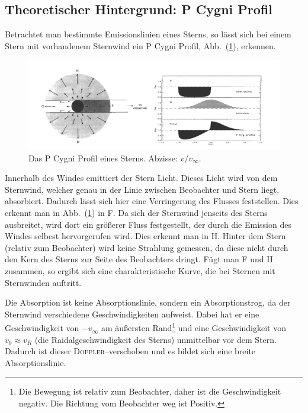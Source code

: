 \subsection{Theoretischer Hintergrund: P Cygni Profil} \label{sec:T-H-P-Cygni}
Betrachtet man bestimmte Emissionslinien eines Sterns, so lässt sich bei einem Stern mit vorhandenem Sternwind ein P Cygni Profil, Abb.\ (\ref{fig:p_cygni_profil}), erkennen.
\begin{figure}[t]
  \centering
  \includegraphics[width=.5\textwidth]{464_p_cygni_profil.png}
  \caption{Das P Cygni Profil eines Sterns. Abzisse: $v/v_\infty$.\cite{anleitung464}} \label{fig:p_cygni_profil}
\end{figure}

Innerhalb des Windes emittiert der Stern Licht.
Dieses Licht wird von dem Sternwind, welcher genau in der Linie zwischen Beobachter und Stern liegt, absorbiert.
Dadurch lässt sich hier eine Verringerung des Flusses feststellen.
Dies erkennt man in Abb.\ (\ref{fig:p_cygni_profil}) in F.
Da sich der Sternwind jenseits des Sterns ausbreitet, wird dort ein größerer Fluss festgestellt, der durch die Emission des Windes selbest hervorgerufen wird.
Dies erkennt man in H.
Hinter dem Stern (relativ zum Beobachter) wird keine Strahlung gemessen, da diese nicht durch den Kern des Sterns zur Seite des Beobachters dringt.
Fügt man F und H zusammen, so ergibt sich eine charakteristische Kurve, die bei Sternen mit Sternwinden auftritt.

Die Absorption ist keine Absorptionslinie, sondern ein Absorptionstrog, da der Sternwind verschiedene Geschwindigkeiten aufweist.
Dabei hat er eine Geschwindigkeit von $-v_\infty$ am äußersten Rand\footnote{Die Bewegung ist relativ zum Beobachter, daher ist die Geschwindigkeit negativ. Die Richtung vom Beobachter weg ist Positiv.} und eine Geschwindigkeit von $v_0\approx v_R$ (die Raidalgeschwindigkeit des Sterns) unmittelbar vor dem Stern. 
Dadurch ist dieser \textsc{Doppler}--verschoben und es bildet sich eine breite Absorptionslinie.

